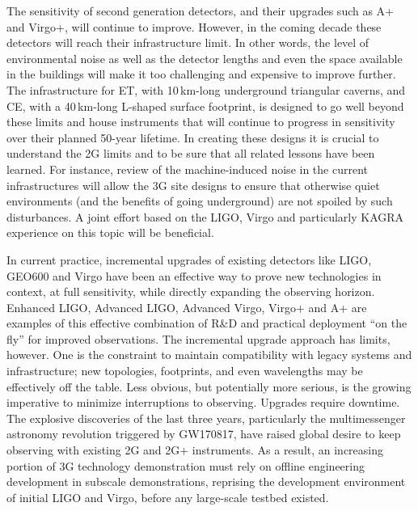 The sensitivity of second generation detectors, and their upgrades such as A+ and Virgo+, will continue to improve. 
However, in the coming decade these detectors will reach their infrastructure limit. In other words, the level of environmental noise as well as the detector lengths and even the space available in the buildings will make it too challenging and expensive to improve further. The infrastructure for ET, with 10\,km-long underground triangular caverns, and CE, with a 40\,km-long L-shaped surface footprint, is designed to go well beyond these limits and house instruments that will continue to progress in sensitivity over their planned 50-year lifetime.   
In creating these designs it is crucial to understand the 2G limits and to be sure that all related lessons have been learned. For instance, review of the machine-induced noise in the current infrastructures will allow the 3G site designs to ensure that otherwise quiet environments (and the benefits of going underground) are not spoiled by such disturbances. A joint effort based on the LIGO, Virgo and particularly KAGRA experience on this topic will be beneficial. 

In current practice, incremental upgrades of existing detectors like LIGO, GEO600  and Virgo have been an effective way to prove new technologies in context, at full sensitivity, while directly expanding the observing horizon. Enhanced LIGO, Advanced LIGO, Advanced Virgo, Virgo+ and A+ are examples of this effective combination of R\&D and practical deployment ``on the fly''  for improved observations.  
The incremental upgrade approach has limits, however.  One is the constraint to maintain compatibility with legacy systems and infrastructure; new topologies, footprints, and even wavelengths may be effectively off the table. Less obvious, but potentially more serious, is the growing imperative to minimize interruptions to observing. Upgrades require downtime.  The explosive discoveries of the last three years, particularly the multimessenger astronomy revolution triggered by GW170817,  have raised global desire to keep observing with existing 2G and 2G+ instruments. 
As a result, an increasing portion of 3G technology demonstration must rely on offline engineering development in subscale demonstrations, reprising the development environment of initial LIGO and Virgo, before any large-scale testbed existed. 

